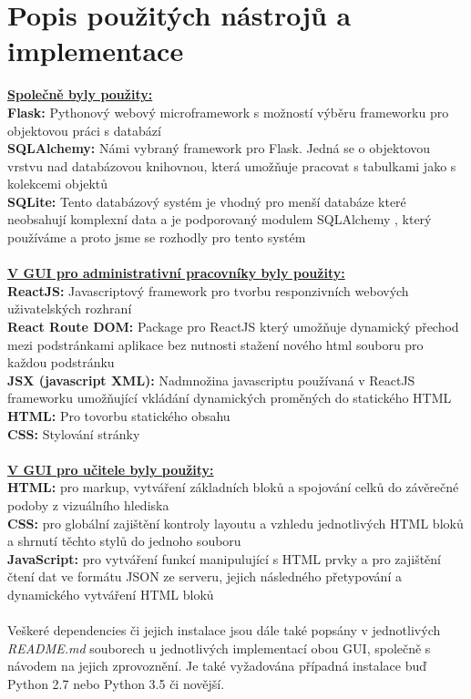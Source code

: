 \documentclass[a4paper, 11pt, twocolumn]{article}
\begin{document}
	
	\newpage


	\section*{\large{Popis použitých nástrojů a implementace}}
	\vspace*{-0.2cm}
	\vspace*{0.3cm}
	\noindent\textbf{\underline{Společně byly použity: }} \\
	\noindent\textbf{Flask: } Pythonový webový microframework s možností výběru frameworku pro objektovou práci s databází \\
	\noindent\textbf{SQLAlchemy: } Námi vybraný framework pro Flask. Jedná se o objektovou vrstvu nad databázovou knihovnou, která umožňuje pracovat s 
	tabulkami jako s kolekcemi objektů \\
	\noindent\textbf{SQLite: } Tento databázový systém je vhodný pro menší databáze které neobsahují komplexní data a je podporovaný modulem 
	SQLAlchemy , který používáme a proto jsme se rozhodly pro tento systém\\
	\vspace*{0.5cm} \\
	\noindent\textbf{\underline{V GUI pro administrativní pracovníky byly použity: }} \\
	\noindent\textbf{ReactJS: } Javascriptový framework pro tvorbu responzivních webových uživatelských rozhraní \\
	\noindent\textbf{React Route DOM: } Package pro ReactJS který umožňuje dynamický přechod mezi podstránkami aplikace bez nutnosti stažení nového html 
	souboru pro každou podstránku \\
	\noindent\textbf{JSX (javascript XML): } Nadmnožina javascriptu používaná v ReactJS frameworku umožňující vkládání dynamických proměných do 
	statického HTML \\
	\noindent\textbf{HTML: } Pro tovorbu statického obsahu \\
	\noindent\textbf{CSS: } Stylování stránky \\
	\vspace*{0.5cm} \\
	\noindent\textbf{\underline{V GUI pro učitele byly použity: }} \\
	\noindent\textbf{HTML: } pro markup, vytváření základních bloků a spojování celků do závěrečné podoby z vizuálního hlediska \\
	\noindent\textbf{CSS: } pro globální zajištění kontroly layoutu a vzhledu jednotlivých HTML bloků a shrnutí těchto stylů do jednoho souboru \\
	\noindent\textbf{JavaScript: } pro vytváření funkcí manipulující s HTML prvky a pro zajištění čtení dat ve formátu JSON ze serveru, jejich následného 
	přetypování a dynamického vytváření HTML bloků \\
	\vspace*{0.5cm} \\
	\noindent Veškeré dependencies či jejich instalace jsou dále také popsány v jednotlivých \textit{README.md} souborech u jednotlivých implementací obou 
	GUI, společně s návodem na jejich zprovoznění. Je také vyžadována případná instalace buď Python 2.7 nebo Python 3.5 či novější. \\
	
\end{document}
